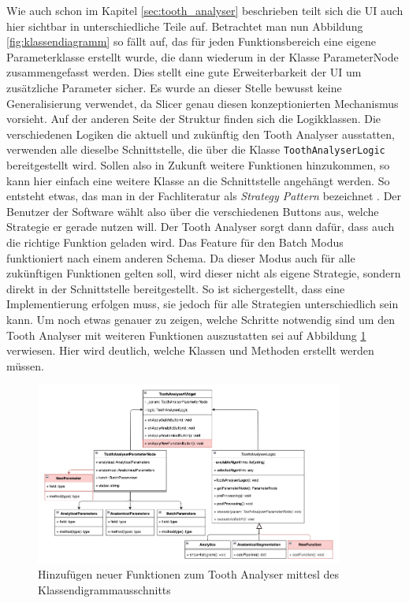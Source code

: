 Wie auch schon im Kapitel \ref{sec:tooth_analyser} beschrieben teilt sich die
\ac{UI} auch hier sichtbar in unterschiedliche Teile auf. Betrachtet man nun
Abbildung \ref{fig:klassendiagramm} so fällt auf, das für jeden Funktionsbereich
eine eigene Parameterklasse erstellt wurde, die dann wiederum in der Klasse
ParameterNode zusammengefasst werden. Dies stellt eine gute Erweiterbarkeit der \ac{UI}
um zusätzliche Parameter sicher. Es wurde an dieser Stelle bewusst keine Generalisierung
verwendet, da Slicer genau diesen konzeptionierten Mechanismus vorsieht. Auf der
anderen Seite der Struktur finden sich die Logikklassen. Die verschiedenen
Logiken die aktuell und zukünftig den Tooth Analyser ausstatten, verwenden alle dieselbe
Schnittstelle, die über die Klasse \texttt{ToothAnalyserLogic} bereitgestellt wird.
Sollen also in Zukunft weitere Funktionen hinzukommen, so kann hier einfach eine
weitere Klasse an die Schnittstelle angehängt werden. So entsteht etwas, das man
in der Fachliteratur als \textit{Strategy Pattern} bezeichnet \citep[vgl.][S. 99]{siebler2014}.
Der Benutzer der Software wählt also über die verschiedenen Buttons aus, welche Strategie
er gerade nutzen will. Der Tooth Analyser sorgt dann dafür, dass auch die richtige
Funktion geladen wird. Das Feature für den Batch Modus funktioniert nach einem
anderen Schema. Da dieser Modus auch für alle zukünftigen Funktionen gelten soll,
wird dieser nicht als eigene Strategie, sondern direkt in der Schnittstelle bereitgestellt.
So ist sichergestellt, dass eine Implementierung erfolgen muss, sie jedoch für
alle Strategien unterschiedlich sein kann. Um noch etwas genauer zu zeigen,
welche Schritte notwendig sind um den Tooth Analyser mit weiteren Funktionen
auszustatten sei auf Abbildung \ref{fig:klassendiagramm_new} verwiesen. Hier wird
deutlich, welche Klassen und Methoden erstellt werden müssen.

\begin{figure}[h]
	\centering
	\includegraphics[width=0.9\textwidth]{
		img/tooth_analyser_class_diagram_new.png
	}
	\caption{Hinzufügen neuer Funktionen zum Tooth Analyser mittesl des
	Klassendigrammausschnitts}
	\label{fig:klassendiagramm_new}
\end{figure}

